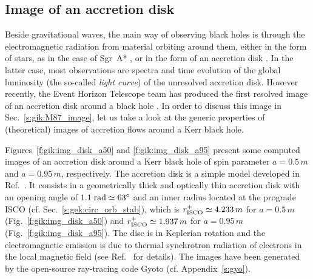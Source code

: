 \subsection{Image of an accretion disk} \label{s:gik:image_disk}

Beside gravitational waves, the main way of observing black holes is through
the electromagnetic radiation from material orbiting around them,
either in the form of stars, as in the case of Sgr~A*  \cite{Abute_al18a,Abute_al20}, or in the
form of an accretion disk \cite{AbramF13}.
In the latter case, most observations are spectra and time evolution of the
global luminosity (the so-called \emph{light curve}) of the
unresolved accretion disk.
However recently, the Event Horizon Telescope team has produced the first
resolved image of an accretion disk around a black hole
\cite{EHT19a,Wielg_al20}.
In order to discuss this image in Sec.~\ref{s:gik:M87_image},
let us take a look at the generic properties of (theoretical) images of accretion flows around
a Kerr black hole.

Figures~\ref{f:gik:img_disk_a50} and \ref{f:gik:img_disk_a95}
present some computed images of an accretion disk around a Kerr black hole
of spin parameter $a=0.5\, m$ and $a=0.95\, m$, respectively.
The accretion disk is a simple model developed in Ref.~\cite{VinceWAGLPG21}.
It consists in a geometrically thick and optically thin accretion disk with
an opening angle of $1.1\; {\rm rad} \simeq 63^\circ$ and an inner radius located at the prograde
ISCO (cf. Sec.~\ref{s:gek:circ_orb_stab}), which is
$r_{\rm ISCO}^+ \simeq 4.233 \, m$
for $a=0.5\, m$ (Fig.~\ref{f:gik:img_disk_a50})
and
$r_{\rm ISCO}^+ \simeq 1.937\, m$
for $a=0.95\, m$ (Fig.~\ref{f:gik:img_disk_a95}). The disc is in Keplerian rotation
and the electromagnetic emission is due to thermal synchrotron radiation
of electrons in the local magnetic field (see Ref.~\cite{VinceWAGLPG21} for details).
The images have been generated by the open-source ray-tracing code
\textsf{Gyoto} \cite{VincePGP11} (cf. Appendix~\ref{s:gyo}).



